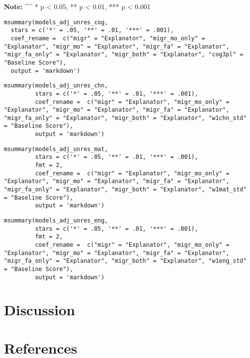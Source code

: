 \documentclass[
  man]{apa7}
\begin{document}
\textbf{Note:}
\^{}\^{} * p \textless{} 0.05, ** p \textless{} 0.01, *** p \textless{} 0.001

\begin{verbatim}
msummary(models_adj_unres_cog,
  stars = c('*' = .05, '**' = .01, '***' = .001), 
  coef_rename =  c("migr" = "Explanator", "migr_mo_only" = "Explanator", "migr_mo" = "Explanator", "migr_fa" = "Explanator", "migr_fa_only" = "Explanator", "migr_both" = "Explanator", "cog3pl" = "Baseline Score"), 
  output = 'markdown')
\end{verbatim}

\begin{verbatim}
msummary(models_adj_unres_chn,
         stars = c('*' = .05, '**' = .01, '***' = .001), 
         coef_rename =  c("migr" = "Explanator", "migr_mo_only" = "Explanator", "migr_mo" = "Explanator", "migr_fa" = "Explanator", "migr_fa_only" = "Explanator", "migr_both" = "Explanator", "w1chn_std" = "Baseline Score"), 
         output = 'markdown')
\end{verbatim}

\begin{verbatim}
msummary(models_adj_unres_mat,
         stars = c('*' = .05, '**' = .01, '***' = .001), 
         fmt = 2,
         coef_rename =  c("migr" = "Explanator", "migr_mo_only" = "Explanator", "migr_mo" = "Explanator", "migr_fa" = "Explanator", "migr_fa_only" = "Explanator", "migr_both" = "Explanator", "w1mat_std" = "Baseline Score"), 
         output = 'markdown')
\end{verbatim}

\begin{verbatim}
msummary(models_adj_unres_eng,
         stars = c('*' = .05, '**' = .01, '***' = .001), 
         fmt = 2,
         coef_rename =  c("migr" = "Explanator", "migr_mo_only" = "Explanator", "migr_mo" = "Explanator", "migr_fa" = "Explanator", "migr_fa_only" = "Explanator", "migr_both" = "Explanator", "w1eng_std" = "Baseline Score"), 
         output = 'markdown')
\end{verbatim}

\hypertarget{discussion}{%
\section{Discussion}\label{discussion}}

\newpage

\hypertarget{references}{%
\section{References}\label{references}}
\end{document}
